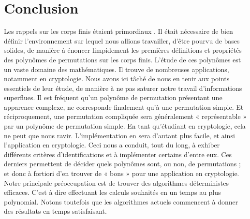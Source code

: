 \documentclass[12pt]{article}
\theoremstyle{remark}\newtheorem{note}{Note}
\theoremstyle{remark}\newtheorem{nota}{Notation}
\theoremstyle{definition}
\begin{document}
\section*{Conclusion}

Les rappels sur les corps finis étaient primordiaux . Il était nécessaire de bien définir l'environnement sur lequel nous allions travailler, d’être pourvu de bases solides, de manière à énoncer limpidement les premières définitions et propriétés des polynômes de permutations sur les corps finis. L'étude de ces polynômes est un vaste domaine des mathématiques. Il trouve de nombreuses applications, notamment en cryptologie. Nous avons ici tâché de nous en tenir aux points essentiels de leur étude, de manière à ne pas saturer notre travail d’informations superflues. \newline
\break
Il est fréquent qu'un polynôme de permutation présentant une apparence complexe, ne corresponde finalement qu’à une permutation simple. Et réciproquement, une permutation compliquée sera généralement « représentable » par un polynôme de permutation simple. En tant qu’étudiant en cryptologie, cela ne peut que nous ravir. L’implémentation en sera d’autant plus facile, et ainsi l’application en cryptologie. \newline
Ceci nous a conduit, tout du long, à exhiber différents critères d’identifications et à implémenter certains d’entre eux. Ces derniers permettent de décider quels polynômes sont, ou non, de permutations ; et donc à fortiori d'en trouver de « bons » pour une application en cryptologie. \newline
Notre principale préoccupation est de trouver des algorithmes déterministes efficaces.  C’est à dire effectuant les calculs souhaités en un temps au plus polynomial. Notons toutefois que les algorithmes actuels commencent à donner des résultats en temps satisfaisant.\\

\pagebreak



\end{document}
